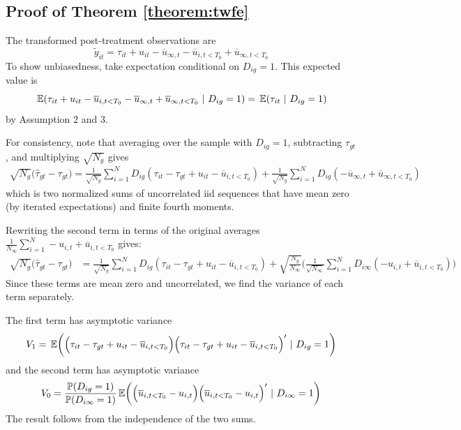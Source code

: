 \documentclass[12pt]{article}
\begin{document}
\subsection*{Proof of Theorem \ref{theorem:twfe}}

The transformed post-treatment observations are
\begin{equation}
    \tilde{y}_{it} = \tau_{it} + u_{it} - \overline{u}_{\infty,t}  - \overline{u}_{i,t < T_0} + \overline{u}_{\infty,t < T_0}
\end{equation}
To show unbiasedness, take expectation conditional on $D_{ig} = 1$. This expected value is
\begin{equation}
    \expec{ \tau_{it} + u_{it} - \overline{u}_{i,t < T_0} - \overline{u}_{\infty,t} + \overline{u}_{\infty,t < T_0} }{D_{ig} = 1} = \expec{\tau_{it}}{D_{ig} = 1}
\end{equation}
by Assumption 2 and 3.

For consistency, note that averaging over the sample with $D_{ig} = 1$, subtracting $\tau_{gt}$, and multiplying $\sqrt{N_{g}}$ gives
\begin{align}
    \sqrt{N_{g}} \big( \widehat{\tau}_{gt} - \tau_{gt} \big) 
    = \frac{1}{\sqrt{N_{g}}}\sum_{i=1}^N D_{ig} (\tau_{it} - \tau_{gt} + u_{it} - \overline{u}_{i,t < T_0})
    + \frac{1}{\sqrt{N_{g}}}\sum_{i = 1}^N D_{ig} (- \overline{u}_{\infty,t} + \overline{u}_{\infty,t < T_0}) 
\end{align}
which is two normalized sums of uncorrelated iid sequences that have mean zero (by iterated expectations) and finite fourth moments. %

Rewriting the second term in terms of the original averages $\frac{1}{N_\infty} \sum_{i=1}^N - u_{i,t} + \overline{u}_{i,t < T_0}$ gives:
\begin{align}
    \sqrt{N_{g}} \big( \widehat{\tau}_{gt} - \tau_{gt} \big) 
    &= \frac{1}{\sqrt{N_{g}}}\sum_{i=1}^N D_{ig} (\tau_{it} - \tau_{gt} + u_{it} - \overline{u}_{i,t < T_0})
    + \sqrt{\frac{N_g}{N_\infty}} \bigg ( \frac{1}{\sqrt{N_\infty}} \sum_{i = 1}^N D_{i\infty} (- u_{i,t} + \overline{u}_{i,t < T_0} ) \bigg)
\end{align}
Since these terms are mean zero and uncorrelated, we find the variance of each term separately. 

The first term has asymptotic variance 
\begin{equation}
V_1 = \expec{\Big( \tau_{it} - \tau_{gt} + u_{it} - \overline{u}_{i,t < T_0} \Big) \Big( \tau_{it} - \tau_{gt} + u_{it} - \overline{u}_{i,t < T_0} \Big)'}{D_{ig} = 1}
\end{equation}
and the second term has asymptotic variance
\begin{equation}
V_0 = \frac{\mathbb{P}(D_{ig} = 1)}{\mathbb{P}(D_{i\infty} = 1)} \expec{ \Big( \overline{u}_{i,t < T_0} - u_{i,t} \Big) \Big( \overline{u}_{i,t < T_0} - u_{i,t} \Big)' }{D_{i\infty} = 1}
\end{equation}
The result follows from the independence of the two sums.
\end{document}
